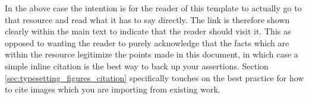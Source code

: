 		In the above case the intention is for the reader of this template to actually go to that resource and read what it has to say directly. The link is therefore shown clearly within the main text to indicate that the reader should visit it. This as opposed to wanting the reader to purely acknowledge that the facts which are within the resource legitimize the points made in this document, in which case a simple inline citation is the best way to back up your assertions. Section \ref{sec:typesetting_figures_citation} specifically touches on the best practice for how to cite images which you are importing from existing work. 